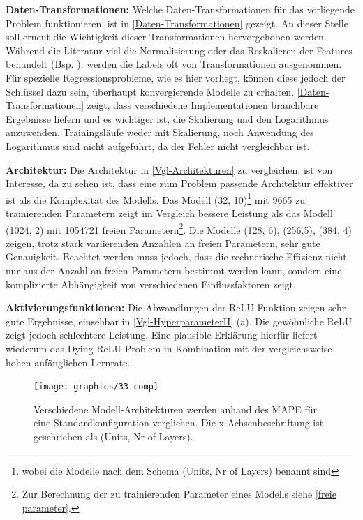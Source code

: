 \textbf{Daten-Transformationen:}
Welche Daten-Transformationen für das vorliegende Problem funktionieren, ist in \textsf{\autoref{Daten-Transformationen}} gezeigt. An dieser Stelle soll erneut die Wichtigkeit dieser Transformationen hervorgehoben werden. Während die Literatur viel die Normalisierung oder das Reskalieren der Features behandelt (Bsp. \cite{FN, feature-scaling}), werden die Labels oft von Transformationen ausgenommen. Für spezielle Regressionsprobleme, wie es hier vorliegt, können diese jedoch der Schlüssel dazu sein, überhaupt konvergierende Modelle zu erhalten. \textsf{\autoref{Daten-Transformationen}} zeigt, dass verschiedene Implementationen brauchbare Ergebnisse liefern und es wichtiger ist, die Skalierung und den Logarithmus anzuwenden. Trainingsläufe weder mit Skalierung, noch Anwendung des Logarithmus sind nicht aufgeführt, da der Fehler nicht vergleichbar ist.

\textbf{Architektur:}
Die Architektur in \textsf{\autoref{Vgl-Architekturen}} zu vergleichen, ist von Interesse, da zu sehen ist, dass eine zum Problem passende Architektur effektiver ist als die Komplexität des Modells. Das Modell (32, 10)\footnote{wobei die Modelle nach dem Schema (Units, Nr of Layers) benannt sind} mit  9665 zu trainierenden Parametern zeigt im Vergleich bessere Leistung als das Modell (1024, 2) mit 1054721 freien Parametern\footnote{Zur Berechnung der zu trainierenden Parameter eines Modells siehe \textsf{\autoref{freie parameter}}.}. Die Modelle (128, 6), (256,5), (384, 4) zeigen, trotz stark variierenden Anzahlen an freien Parametern, sehr gute Genauigkeit. Beachtet werden muss jedoch, dass die rechnerische Effizienz nicht nur aus der Anzahl an freien Parametern bestimmt werden kann, sondern eine komplizierte Abhängigkeit von verschiedenen Einflussfaktoren zeigt.   


\textbf{Aktivierungsfunktionen:} 
Die Abwandlungen der ReLU-Funktion zeigen sehr gute Ergebnisse, einsehbar in \textsf{\autoref{Vgl-HyperparameterII} (a)}. Die gewöhnliche ReLU zeigt jedoch schlechtere Leistung. Eine plausible Erklärung hierfür liefert wiederum das Dying-ReLU-Problem in Kombination mit der vergleichsweise hohen anfänglichen Lernrate.  
\begin{figure}[bt!]
	\centering
	\captionsetup{justification=justified}
	\texttt{[image: graphics/33-comp]}
	\caption{Verschiedene Modell-Architekturen werden anhand des MAPE für eine Standardkonfiguration verglichen. Die
		x-Achsenbeschriftung ist geschrieben als (Units, Nr of Layers).}
	\label{Vgl-Architekturen}
\end{figure}

